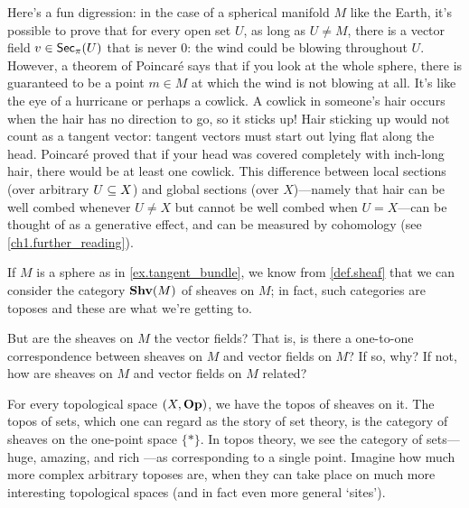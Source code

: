 \documentclass[7Sketches]{subfiles}
\begin{document}
\begin{example}
Here's a fun digression: in the case of a spherical manifold $M$ like the Earth,
it's possible to prove that for every open set $U$, as long as $U\neq M$, there
is a vector field $v\in\Fun{Sec}_\pi(U)$ that is never 0: the wind could be
blowing throughout $U$. However, a theorem of Poincar\'e says that if you look
at the whole sphere, there is guaranteed to be a point $m\in M$ at which the
wind is not blowing at all. It's like the eye of a hurricane or perhaps a
cowlick. A cowlick in someone's hair occurs when the hair has no direction to
go, so it sticks up! Hair sticking up would not count as a tangent vector:
tangent vectors must start out lying flat along the head. Poincar\'{e} proved
that if your head was covered completely with inch-long hair, there would be at
least one cowlick. This difference between local sections (over arbitrary $U\ss
X$) and global sections (over $X$)---namely that hair can be well combed
whenever $U\neq X$ but cannot be well combed when $U=X$---can be thought of as a
generative effect, and can be measured by cohomology (see
\cref{ch1.further_reading}).%
\end{example}%

\begin{exercise}%
\label{exc.whats_the_sheaf}
If $M$ is a sphere as in \cref{ex.tangent_bundle}, we know from \cref{def.sheaf} that we can consider the category $\Shv(M)$ of sheaves on $M$; in fact, such categories are toposes and these are what we're getting to.

But are the sheaves on $M$ the vector fields? That is, is there a one-to-one correspondence between sheaves on $M$ and vector fields on $M$? If so, why? If not, how are sheaves on $M$ and vector fields on $M$ related?
\end{exercise}

\begin{example}%
\label{ex.Sets_as_sheaves}%
For every topological space $(X,\Op)$, we have the topos of sheaves on it. The topos of sets, which one can regard as the story of set theory, is the category of sheaves on the one-point space $\{*\}$. In topos theory, we see the category of sets---huge, amazing, and rich ---as corresponding to a single point. Imagine how much more complex arbitrary toposes are, when they can take place on much more interesting topological spaces (and in fact even more general `sites').
\end{example}
\end{document}
